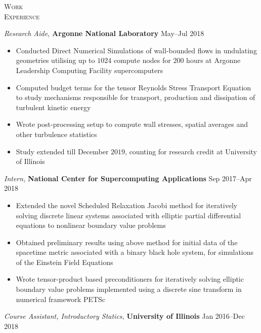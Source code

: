 \documentclass[10pt]{article}
\begin{document}
\begin{multicols}{2}
\textsc{\small Work \\ Experience}
\columnbreak

{\sl Research Aide,} \textbf{Argonne National Laboratory} \hfill May--Jul 2018

\vspace{-2.0em}
\begin{itemize}[label=-]
    \setlength\itemsep{-0.5em}
    \item Conducted Direct Numerical Simulations of wall-bounded flows in undulating geometries utilising up to $1024$ compute nodes for $200$ hours at Argonne Leadership Computing Facility supercomputers
    \item Computed budget terms for the tensor Reynolds Stress Transport Equation to study mechanisms responsible for transport, production and dissipation of turbulent kinetic energy%
    \item Wrote post-processing setup to compute wall stresses, spatial averages and other turbulence statistics
    \item Study extended till December $2019$, counting for research credit at University of Illinois
\end{itemize}
\vspace{-2.0em}
%
\vspace{0.5em}
%
{\sl Intern,} \textbf{National Center for Supercomputing Applications} \hfill Sep 2017--Apr 2018

\vspace{-2.0em}
\begin{itemize}[label=-]
    \setlength\itemsep{-0.5em}
    \item Extended the novel Scheduled Relaxation Jacobi method for iteratively solving discrete linear systems associated with elliptic partial differential equations to nonlinear boundary value problems
    \item Obtained preliminary results using above method for initial data of the spacetime metric associated with a binary black hole system, for simulations of the Einstein Field Equations
    \item Wrote tensor-product based preconditioners for iteratively solving elliptic boundary value problems implemented using a discrete sine transform in numerical framework PETSc
\end{itemize}
\vspace{-2.0em}
%
\vspace{0.5em}
%
{\sl Course Assistant, Introductory Statics,} \textbf{University of Illinois} \hfill Jan 2016--Dec 2018


\end{multicols}
\end{document}
